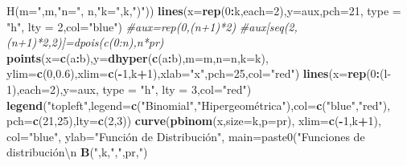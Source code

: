 \documentclass[]{book}
\newenvironment{Shaded}{\begin{snugshade}}{\end{snugshade}}
\newcommand{\CommentTok}[1]{\textcolor[rgb]{0.56,0.35,0.01}{\textit{#1}}}
\newcommand{\DataTypeTok}[1]{\textcolor[rgb]{0.13,0.29,0.53}{#1}}
\newcommand{\DecValTok}[1]{\textcolor[rgb]{0.00,0.00,0.81}{#1}}
\newcommand{\FloatTok}[1]{\textcolor[rgb]{0.00,0.00,0.81}{#1}}
\newcommand{\KeywordTok}[1]{\textcolor[rgb]{0.13,0.29,0.53}{\textbf{#1}}}
\newcommand{\NormalTok}[1]{#1}
\newcommand{\OperatorTok}[1]{\textcolor[rgb]{0.81,0.36,0.00}{\textbf{#1}}}
\newcommand{\StringTok}[1]{\textcolor[rgb]{0.31,0.60,0.02}{#1}}
\begin{document}
\begin{Shaded}
\begin{Highlighting}[]
\StringTok{                   H(m="}\NormalTok{,m,}\StringTok{"n="}\NormalTok{, n,}\StringTok{"k="}\NormalTok{,k,}\StringTok{")"}\NormalTok{))}
  \KeywordTok{lines}\NormalTok{(}\DataTypeTok{x=}\KeywordTok{rep}\NormalTok{(}\DecValTok{0}\OperatorTok{:}\NormalTok{k,}\DataTypeTok{each=}\DecValTok{2}\NormalTok{),}\DataTypeTok{y=}\NormalTok{aux,}\DataTypeTok{pch=}\DecValTok{21}\NormalTok{, }\DataTypeTok{type =} \StringTok{"h"}\NormalTok{, }\DataTypeTok{lty =} \DecValTok{2}\NormalTok{,}\DataTypeTok{col=}\StringTok{"blue"}\NormalTok{)}
  \CommentTok{#aux=rep(0,(n+1)*2)}
  \CommentTok{#aux[seq(2,(n+1)*2,2)]=dpois(c(0:n),n*pr)}
  \KeywordTok{points}\NormalTok{(}\DataTypeTok{x=}\KeywordTok{c}\NormalTok{(a}\OperatorTok{:}\NormalTok{b),}\DataTypeTok{y=}\KeywordTok{dhyper}\NormalTok{(}\KeywordTok{c}\NormalTok{(a}\OperatorTok{:}\NormalTok{b),}\DataTypeTok{m=}\NormalTok{m,}\DataTypeTok{n=}\NormalTok{n,}\DataTypeTok{k=}\NormalTok{k),}
         \DataTypeTok{ylim=}\KeywordTok{c}\NormalTok{(}\DecValTok{0}\NormalTok{,}\FloatTok{0.6}\NormalTok{),}\DataTypeTok{xlim=}\KeywordTok{c}\NormalTok{(}\OperatorTok{-}\DecValTok{1}\NormalTok{,k}\OperatorTok{+}\DecValTok{1}\NormalTok{),}\DataTypeTok{xlab=}\StringTok{"x"}\NormalTok{,}\DataTypeTok{pch=}\DecValTok{25}\NormalTok{,}\DataTypeTok{col=}\StringTok{"red"}\NormalTok{)}
  \KeywordTok{lines}\NormalTok{(}\DataTypeTok{x=}\KeywordTok{rep}\NormalTok{(}\DecValTok{0}\OperatorTok{:}\NormalTok{(l}\DecValTok{-1}\NormalTok{),}\DataTypeTok{each=}\DecValTok{2}\NormalTok{),}\DataTypeTok{y=}\NormalTok{aux, }\DataTypeTok{type =} \StringTok{"h"}\NormalTok{, }\DataTypeTok{lty =} \DecValTok{3}\NormalTok{,}\DataTypeTok{col=}\StringTok{"red"}\NormalTok{)}
  \KeywordTok{legend}\NormalTok{(}\StringTok{"topleft"}\NormalTok{,}\DataTypeTok{legend=}\KeywordTok{c}\NormalTok{(}\StringTok{"Binomial"}\NormalTok{,}\StringTok{"Hipergeométrica"}\NormalTok{),}\DataTypeTok{col=}\KeywordTok{c}\NormalTok{(}\StringTok{"blue"}\NormalTok{,}\StringTok{"red"}\NormalTok{),}
         \DataTypeTok{pch=}\KeywordTok{c}\NormalTok{(}\DecValTok{21}\NormalTok{,}\DecValTok{25}\NormalTok{),}\DataTypeTok{lty=}\KeywordTok{c}\NormalTok{(}\DecValTok{2}\NormalTok{,}\DecValTok{3}\NormalTok{))}
  \KeywordTok{curve}\NormalTok{(}\KeywordTok{pbinom}\NormalTok{(x,}\DataTypeTok{size=}\NormalTok{k,}\DataTypeTok{p=}\NormalTok{pr),}
        \DataTypeTok{xlim=}\KeywordTok{c}\NormalTok{(}\OperatorTok{-}\DecValTok{1}\NormalTok{,k}\OperatorTok{+}\DecValTok{1}\NormalTok{), }\DataTypeTok{col=}\StringTok{"blue"}\NormalTok{, }\DataTypeTok{ylab=}\StringTok{"Función de Distribución",}
\StringTok{         main=paste0("}\NormalTok{Funciones de distribución\textbackslash{}n }\KeywordTok{B}\NormalTok{(}\StringTok{",k,"}\NormalTok{,}\StringTok{",pr,"}\NormalTok{) }

\end{Highlighting}
\end{Shaded}
\end{document}
